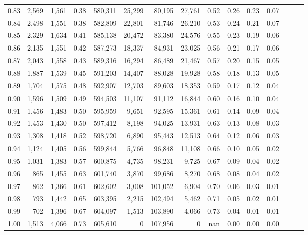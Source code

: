 \begin{tabular}{rrrrrrrrrrrrrrr}
0.83 &   2,569 &  1,561 &  0.38 &  580,311 &   25,299 &   80,195 &   27,761 &  0.52 &  0.26 &  0.23 &      0.07 \\
0.84 &   2,498 &  1,551 &  0.38 &  582,809 &   22,801 &   81,746 &   26,210 &  0.53 &  0.24 &  0.21 &      0.07 \\
0.85 &   2,329 &  1,634 &  0.41 &  585,138 &   20,472 &   83,380 &   24,576 &  0.55 &  0.23 &  0.19 &      0.06 \\
0.86 &   2,135 &  1,551 &  0.42 &  587,273 &   18,337 &   84,931 &   23,025 &  0.56 &  0.21 &  0.17 &      0.06 \\
0.87 &   2,043 &  1,558 &  0.43 &  589,316 &   16,294 &   86,489 &   21,467 &  0.57 &  0.20 &  0.15 &      0.05 \\
0.88 &   1,887 &  1,539 &  0.45 &  591,203 &   14,407 &   88,028 &   19,928 &  0.58 &  0.18 &  0.13 &      0.05 \\
0.89 &   1,704 &  1,575 &  0.48 &  592,907 &   12,703 &   89,603 &   18,353 &  0.59 &  0.17 &  0.12 &      0.04 \\
0.90 &   1,596 &  1,509 &  0.49 &  594,503 &   11,107 &   91,112 &   16,844 &  0.60 &  0.16 &  0.10 &      0.04 \\
0.91 &   1,456 &  1,483 &  0.50 &  595,959 &    9,651 &   92,595 &   15,361 &  0.61 &  0.14 &  0.09 &      0.04 \\
0.92 &   1,453 &  1,430 &  0.50 &  597,412 &    8,198 &   94,025 &   13,931 &  0.63 &  0.13 &  0.08 &      0.03 \\
0.93 &   1,308 &  1,418 &  0.52 &  598,720 &    6,890 &   95,443 &   12,513 &  0.64 &  0.12 &  0.06 &      0.03 \\
0.94 &   1,124 &  1,405 &  0.56 &  599,844 &    5,766 &   96,848 &   11,108 &  0.66 &  0.10 &  0.05 &      0.02 \\
0.95 &   1,031 &  1,383 &  0.57 &  600,875 &    4,735 &   98,231 &    9,725 &  0.67 &  0.09 &  0.04 &      0.02 \\
0.96 &     865 &  1,455 &  0.63 &  601,740 &    3,870 &   99,686 &    8,270 &  0.68 &  0.08 &  0.04 &      0.02 \\
0.97 &     862 &  1,366 &  0.61 &  602,602 &    3,008 &  101,052 &    6,904 &  0.70 &  0.06 &  0.03 &      0.01 \\
0.98 &     793 &  1,442 &  0.65 &  603,395 &    2,215 &  102,494 &    5,462 &  0.71 &  0.05 &  0.02 &      0.01 \\
0.99 &     702 &  1,396 &  0.67 &  604,097 &    1,513 &  103,890 &    4,066 &  0.73 &  0.04 &  0.01 &      0.01 \\
1.00 &   1,513 &  4,066 &  0.73 &  605,610 &        0 &  107,956 &        0 &   nan &  0.00 &  0.00 &      0.00 \\
\bottomrule
\end{tabular}
